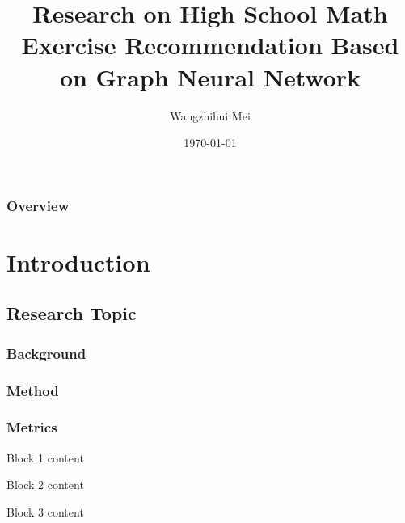\documentclass{beamer}
\title[Short title]{Research on High School Math Exercise Recommendation Based on Graph Neural Network} %
\author{Wangzhihui Mei} %
\institute[UOW] %
{
University of Wollongong \\ %
\medskip
\textit{maywzh@gmail.com} %
}
\date{\today} %
\begin{document}
\begin{frame}
  \titlepage %
\end{frame}

\begin{frame}
  \frametitle{Overview} %
  \tableofcontents %
\end{frame}


\section{Introduction} %

\subsection{Research Topic}

\begin{frame}
  \frametitle{Background}

\end{frame}


\begin{frame}
  \frametitle{Method}

\end{frame}


\begin{frame}
  \frametitle{Metrics}
  \begin{block}{Block 1}
    content
  \end{block}

  \begin{block}{Block 2}
    content
  \end{block}

  \begin{block}{Block 3}
    content
  \end{block}
\end{frame}
\end{document}
